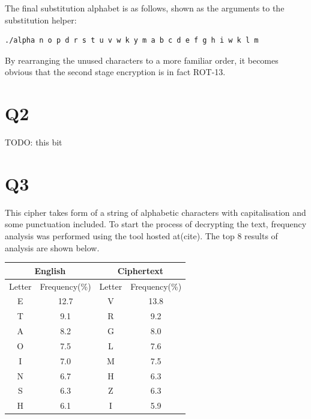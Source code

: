 \documentclass[pdflatex, a4paper,12pt]{article}
\begin{document}
\begin{quote}
    
\end{quote}

The final substitution alphabet is as follows, shown as the arguments to the
substitution helper:

\begin{verbatim}
./alpha n o p d r s t u v w k y m a b c d e f g h i w k l m
\end{verbatim}
By rearranging the unused characters to a more familiar order, it becomes
obvious that the second stage encryption is in fact ROT-13.

\section{Q2}

TODO: this bit

\section{Q3}

This cipher takes form of a string of alphabetic characters with capitalisation
and some punctuation included. To start the process of decrypting the text, frequency
analysis was performed using the tool hosted at(cite). The top 8 results of
analysis are shown below.

\begin{center}
\begin{tabular}{cc|cc}
    \multicolumn{2}{c|}{English} & \multicolumn{2}{c}{Ciphertext} \\
    \hline
    Letter & Frequency(\%) & Letter & Frequency(\%) \\
    \hline
    E                & 12.7         & V      & 13.8  \\
    T                & 9.1          & R      & 9.2   \\
    A                & 8.2          & G      & 8.0   \\
    O                & 7.5          & L      & 7.6   \\
    I                & 7.0          & M      & 7.5   \\
    N                & 6.7          & H      & 6.3   \\
    S                & 6.3          & Z      & 6.3   \\
    H                & 6.1          & I      & 5.9   \\
\end{tabular}
\end{center}
\end{document}
